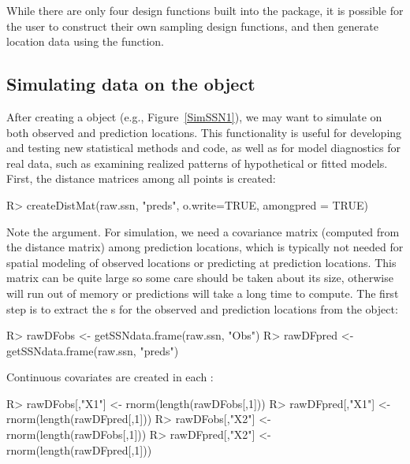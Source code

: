 \documentclass[nojss]{jss}
\renewenvironment{Schunk}{\vspace{\topsep}}{\vspace{\topsep}}
\begin{document}
While there are only four design functions built into the package, it
is possible for the user to construct their own sampling design
functions, and then generate location data using the 
function.



\subsection[Simulating data on the SpatialStreamNetwork object]{Simulating data on the  object}

After creating a  object (e.g.,
Figure~\ref{SimSSN1}), we may want to simulate on both observed and
prediction locations.  This functionality is useful for developing and
testing new statistical methods and code, as well as for model
diagnostics for real data, such as examining realized patterns of
hypothetical or fitted models.  First, the distance matrices among all
points is created:

\begin{Schunk}
\begin{Sinput}
R> createDistMat(raw.ssn, "preds", o.write=TRUE, amongpred = TRUE)
\end{Sinput}
\end{Schunk}

Note the  argument.  For simulation, we need a
covariance matrix (computed from the distance matrix) among prediction
locations, which is typically not needed for spatial modeling of
observed locations or predicting at prediction locations.  This matrix
can be quite large so some care should be taken about its size,
otherwise  will run out of memory or predictions will take
a long time to compute.  The first step is to extract the
 s for the observed and prediction
locations from the  object:

\begin{Schunk}
\begin{Sinput}
R> rawDFobs <- getSSNdata.frame(raw.ssn, "Obs")
R> rawDFpred <- getSSNdata.frame(raw.ssn, "preds")
\end{Sinput}
\end{Schunk}

Continuous covariates are created in each :

\begin{Schunk}
\begin{Sinput}
R> rawDFobs[,"X1"] <- rnorm(length(rawDFobs[,1]))
R> rawDFpred[,"X1"] <- rnorm(length(rawDFpred[,1]))
R> rawDFobs[,"X2"] <- rnorm(length(rawDFobs[,1]))
R> rawDFpred[,"X2"] <- rnorm(length(rawDFpred[,1]))
\end{Sinput}
\end{Schunk}
\end{document}
